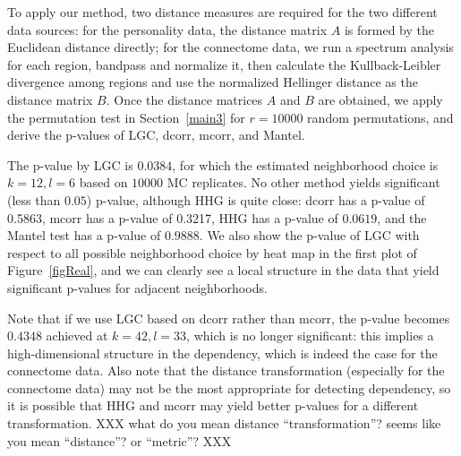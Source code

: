 \documentclass[11pt]{article}
\begin{document}
To apply our method, two distance measures are required for the two different data sources: for the personality data, the distance matrix $A$ is formed by the Euclidean distance directly; for the connectome data, we run a spectrum analysis for each region, bandpass and normalize it, then calculate the Kullback-Leibler divergence among regions and use the normalized Hellinger distance as the distance matrix $B$. Once the distance matrices $A$ and $B$ are obtained, we apply the permutation test in Section~\ref{main3} for $r=10000$ random permutations, and derive the p-values of LGC, dcorr, mcorr, and Mantel. 

The p-value by LGC is $0.0384$, for which the estimated neighborhood choice is $k=12, l=6$ based on $10000$ MC replicates. No other method yields significant (less than $0.05$) p-value, although HHG is quite close: dcorr has a p-value of 0.5863, mcorr has a p-value of 0.3217, HHG has a p-value of $0.0619$, and the Mantel test has a p-value of $0.9888$. We also show the p-value of LGC with respect to all possible neighborhood choice by heat map in the first plot of Figure~\ref{figReal}, and we can clearly see a local structure in the data that yield significant p-values for adjacent neighborhoods.

Note that if we use LGC based on dcorr rather than mcorr, the p-value becomes $0.4348$ achieved at $k=42, l=33$, which is no longer significant: this implies a high-dimensional structure in the dependency, which is indeed the case for the connectome data. Also note that the distance transformation (especially for the connectome data) may not be the most appropriate for detecting dependency, so it is possible that HHG and mcorr may yield better p-values for a different transformation.  XXX what do you mean distance ``transformation''?  seems like you mean ``distance''? or ``metric''? XXX
\end{document}
